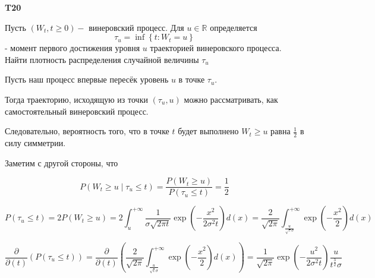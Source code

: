 \documentclass[a4paper,12pt]{article} %
\begin{document}
\begin{example}\textbf{T20}

Пусть $\left(W_{t}, t \geq 0\right)-$ винеровский процесс. Для $u \in \mathbb{R}$ определяется
$$
\tau_{u}=\inf \left\{t: W_{t}=u\right\}
$$
- момент первого достижения уровня $u$ траекторией винеровского процесса. 
Найти плотность распределения случайной величины $\tau_{u}$




Пусть наш процесс впервые пересёк уровень $u$ в точке $\tau_{u}$. 

Тогда траекторию, исходящую из точки $\left(\tau_{u}, u\right)$ можно рассматривать, как самостоятельный винеровский процесс. 


Следовательно, вероятность того, что в точке $t$ будет выполнено $W_{t} \geq u$ равна $\frac{1}{2}$ в силу симметрии. 


Заметим с другой стороны, что




$$
P\left(W_{t} \geq u \mid \tau_{u} \leq t\right)
=
\frac{P\left(W_{t} \geq u\right)}{P\left(\tau_{u} \leq t\right)}=\frac{1}{2}
$$



$$
P\left(\tau_{u} \leq t\right)=2 P\left(W_{t} \geq u\right)
=
2 \int_{u}^{+\infty} \frac{1}{\sigma \sqrt{2 \pi t}} \exp \left(-\frac{x^{2}}{2 \sigma^{2} t}\right) d(x)
=
\frac{2}{\sqrt{2 \pi}} \int_{\frac{u}{\sqrt{\tau} \sigma}}^{+\infty} \exp \left(-\frac{x^{2}}{2}\right) d(x)
$$



$$
\frac{\partial}{\partial(t)}\left(P\left(\tau_{u} \leq t\right)\right)
=
\frac{\partial}{\partial(t)}\left(\frac{2}{\sqrt{2 \pi}} \int_{\frac{u}{\sqrt{t} \sigma}}^{+\infty} \exp \left(-\frac{x^{2}}{2}\right) d(x)\right)
=
\frac{1}{\sqrt{2 \pi}} \exp \left(-\frac{u^{2}}{2 \sigma^{2} t}\right) \frac{u}{t^{\frac{3}{2}} \sigma}
$$











\end{example}
\end{document}

